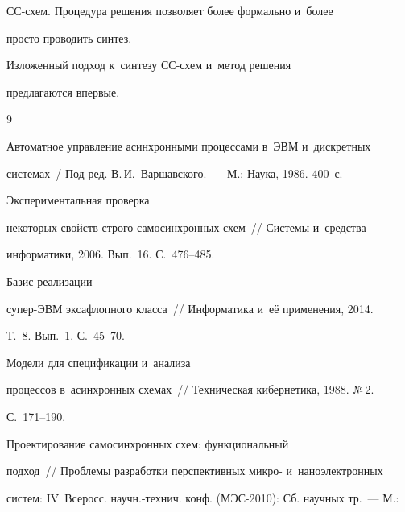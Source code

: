 СС-схем. Процедура решения позволяет более формально и~более 


просто проводить синтез.


   


   Изложенный подход к~синтезу СС-схем и~метод решения 


предлагаются впервые.





{\small\frenchspacing


{%




\begin{thebibliography}{9}




Автоматное управление асинхронными процессами в~ЭВМ и~дискретных 


системах~/ Под ред. В.\,И.~Варшавского.~--- М.: Наука, 1986. 400~с.




 Экспериментальная проверка 


некоторых свойств строго самосинхронных схем~/\!\!/ Системы и~средства 


информатики, 2006. Вып.~16. С.~476--485.




 Базис реализации 


су\-пер-ЭВМ эксафлопного класса~/\!\!/ Информатика и~её применения, 2014. 


Т.~8. Вып.~1. С.~45--70. 




 Модели для спецификации и~анализа 


процессов в~асинхронных схемах~/\!\!/ Техническая кибернетика, 1988. №\,2. 


С.~171--190.




 Проектирование самосинхронных схем: функциональный 


подход~/\!\!/ Проблемы разработки перспективных микро- и~наноэлектронных 


систем: IV~Всеросс. научн.-технич. конф. (МЭС-2010): Сб. научных тр.~--- М.: 



\end{thebibliography}}}
